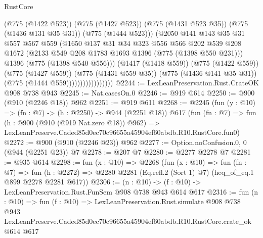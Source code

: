 \begin{lexlean}{RustCore}
\begin{coremodule}
                                  (@775 (@1422 @523))
                                  (@775 (@1427 @523))
                                  (@775 (@1431 @523 @35))
                                  (@775 (@1436 @131 @35 @31))
                                  (@775 (@1444 @523)))
                                (@2050
                                  @141
                                  @143
                                  @35
                                  @31
                                  @557
                                  @567
                                  @559
                                  (@1650
                                    @137
                                    @31
                                    @34
                                    @323
                                    @556
                                    @566
                                    @202
                                    @539
                                    @208
                                    @1672
                                    (@2133 @549 @208 @1783 @1693 @1396 (@775 (@1398 @550 @231)))
                                    @1396
                                    (@775 (@1398 @540 @556)))
                                  (@1417 (@1418 @559))
                                  (@775 (@1422 @559))
                                  (@775 (@1427 @559))
                                  (@775 (@1431 @559 @35))
                                  (@775 (@1436 @141 @35 @31))
                                  (@775 (@1444 @559)))))))))))))))))
@2244 := LexLeanPreservation.Rust.CrateOK @908 @738 @943
@2245 := Nat.casesOn.{0}
@2246 := @919 @614
@2250 := @900 (@910 (@2246 @18)) @962
@2251 := @919 @611
@2268 := @2245
    (fun (y : @10) => (fn : @7) -> (h : @2250) -> @944 (@2251 @18))
    @617
    (fun (fn : @7) =>
    fun (h : @900 (@910 (@919 Nat.zero @18)) @962) =>
    LexLeanPreserve.Caded85d0ec70c96655a45904ef60abdb.R10.RustCore.fun0)
@2272 := @900 (@910 (@2246 @23)) @962
@2277 := Option.noConfusion.{0, 0} (@944 (@2251 @23)) @7
@2278 := @207 @7
@2280 := @2277 @2278 @7
@2281 := @935 @614
@2298 := fun (x : @10) =>
  @2268
    (fun (x : @10) =>
    fun (fn : @7) =>
    fun (h : @2272) => @2280 @2281 (Eq.refl.{2} (Sort 1) @7) (heq_of_eq.{1} @899 @2278 @2281 @617))
@2306 := (n : @10) -> (f : @10) -> LexLeanPreservation.Rust.FunSem @908 @738 @943 @614 @617
@2316 := fun (n : @10) =>
  fun (f : @10) =>
  LexLeanPreservation.Rust.simulate
    @908
    @738
    @943
    LexLeanPreserve.Caded85d0ec70c96655a45904ef60abdb.R10.RustCore.crate_ok
    @614
    @617
\end{coremodule}
\end{lexlean}
